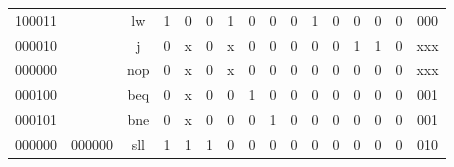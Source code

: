 \documentclass[twocolumn]{article} %
\begin{document}
\begin{sloppypar}
\begin{table}[t]
\begin{tabular}{cccccccccccccccc}
100011                      &                            & lw                    & 1                       & 0                       & 0                       & 1                       & 0                       & 0                       & 0                       & 1                       & 0                       & 0                      & 0                        & 0                        & 000   \\
000010                      &                            & j                     & 0                       & x                       & 0                       & x                       & 0                       & 0                       & 0                       & 0                       & 0                       & 1                      & 1                        & 0                        & xxx   \\
000000                      &                            & nop                   & 0                       & x                       & 0                       & x                       & 0                       & 0                       & 0                       & 0                       & 0                       & 0                      & 0                        & 0                        & xxx   \\
000100                      &                            & beq                   & 0                       & x                       & 0                       & 0                       & 1                       & 0                       & 0                       & 0                       & 0                       & 0                      & 0                        & 0                        & 001   \\
000101                      &                            & bne                   & 0                       & x                       & 0                       & 0                       & 0                       & 1                       & 0                       & 0                       & 0                       & 0                      & 0                        & 0                        & 001   \\
000000                      & 000000                     & sll                   & 1                       & 1                       & 1                       & 0                       & 0                       & 0                       & 0                       & 0                       & 0                       & 0                      & 0                        & 0                        & 010   \\

\end{tabular}
\end{table}
\end{sloppypar}
\end{document}
